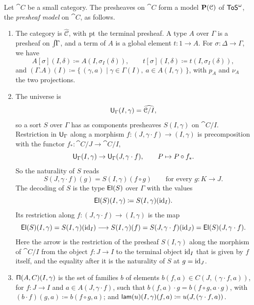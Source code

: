 \begin{lemma}\label{lem:presheaf-model}
    Let $\cat{C}$ be a small category. The presheaves on $\cat{C}$ form a model $\mathbf{P}(\mathcal{C})$ of $\mathsf{ToS}^\omega$, the \emph{presheaf model} on $\cat{C}$, as follows.
    \begin{enumerate}
        \item The category is $\widehat{\mathcal{C}}$, with $\mathrm{pt}$ the terminal presheaf. A type $A$ over $\Gamma$ is a presheaf on $\int\!\!\Gamma$, and a term of $A$ is a global element $t : 1 \to A$. For $\sigma : \Delta \to \Gamma$, we have
        \[
            A[\sigma](I, \delta) \coloneqq A(I, \sigma_I(\delta)), \qquad t[\sigma](I, \delta) \coloneqq t(I, \sigma_I(\delta)),
        \]
        and $(\Gamma.A)(I) \coloneqq \{\, (\gamma, a) \mid \gamma \in \Gamma(I),\ a \in A(I, \gamma) \,\}$, with $p_A$ and $\nu_A$ the two projections.
        \item The universe is
        \[
            \mathsf{U}_\Gamma(I,\gamma) = \widehat{\mathcal{C}/I},
        \] 
        so a sort $S$ over $\Gamma$ has as components presheaves $S(I, \gamma)$ on $\cat{C}/I$. Restriction in $\mathsf{U}_\Gamma$ along a morphism $f : (J, \gamma \cdot f) \to (I, \gamma)$ is precomposition with the functor $f_* : \cat{C}/J \to \cat{C}/I$,
        \[
            \mathsf{U}_\Gamma(I, \gamma) \to \mathsf{U}_\Gamma(J, \gamma \cdot f), \qquad P \mapsto P \circ f_*.
        \]
        So the naturality of $S$ reads
        \[
            S(J, \gamma \cdot f)(g) = S(I, \gamma)(f \circ g) \qquad \text{for every } g : K \to J.
        \]
        The decoding of $S$ is the type $\mathsf{El}(S)$ over $\Gamma$ with the values
        \[
            \mathsf{El}(S)(I, \gamma) \coloneqq S(I, \gamma)(\mathrm{id}_I).
        \]
        Its restriction along $f : (J, \gamma \cdot f) \to (I, \gamma)$ is the map
        \[
            \mathsf{El}(S)(I, \gamma) = S(I, \gamma)(\mathrm{id}_I) \longrightarrow S(I, \gamma)(f) = S(J, \gamma \cdot f)(\mathrm{id}_J) = \mathsf{El}(S)(J, \gamma \cdot f).
        \]
        Here the arrow is the restriction of the presheaf $S(I, \gamma)$ along the morphism of $\cat{C}/I$ from the object $f : J \to I$ to the terminal object $\mathrm{id}_I$ that is given by $f$ itself, and the equality after it is the naturality of $S$ at $g = \mathrm{id}_J$.
        \item $\mathsf{\Pi}(A, C)(I, \gamma)$ is the set of families $b$ of elements $b(f, a) \in C(J, (\gamma \cdot f, a))$, for $f : J \to I$ and $a \in A(J, \gamma \cdot f)$, such that $b(f, a) \cdot g = b(f \circ g, a \cdot g)$, with $(b \cdot f)(g, a) \coloneqq b(f \circ g, a)$; and $\mathsf{lam}(u)(I, \gamma)(f, a) \coloneqq u(J, (\gamma \cdot f, a))$.

\end{enumerate}
\end{lemma}
